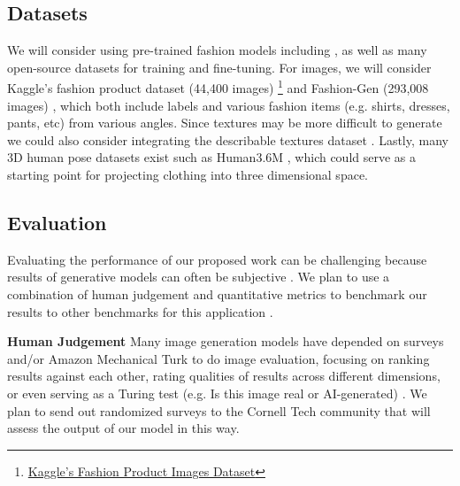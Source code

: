 \documentclass{article}
\begin{document}



\subsection{Datasets}

We will consider using pre-trained fashion models including \cite{todo}, as well as many open-source datasets for training and fine-tuning. For images, we will consider Kaggle's fashion product dataset (44,400 images) \footnote{\href{https://www.kaggle.com/datasets/paramaggarwal/fashion-product-images-dataset}{Kaggle's Fashion Product Images Dataset}} and Fashion-Gen (293,008 images) \cite{rost2018fashiongen}, which both include labels and various fashion items (e.g. shirts, dresses, pants, etc) from various angles. Since textures may be more difficult to generate we could also consider integrating the describable textures dataset \cite{cimpoi14describing}. Lastly, many 3D human pose datasets exist such as Human3.6M \cite{Ionescu2011pose}\cite{Ionescu2014pose}, which could serve as a starting point for projecting clothing into three dimensional space.


\subsection{Evaluation}
Evaluating the performance of our proposed work can be challenging because results of generative models can often be subjective \cite{borji2018eval}. We plan to use a combination of human judgement and quantitative metrics to benchmark our results to other benchmarks for this application \cite{todo}.

\textbf{Human Judgement} Many image generation models have depended on surveys and/or Amazon Mechanical Turk \cite{zhou2019hype} to do image evaluation, focusing on ranking results against each other, rating qualities of results across different dimensions, or even serving as a Turing test (e.g. Is this image real or AI-generated) \cite{salimans2016eval}. We plan to send out randomized surveys to the Cornell Tech community that will assess the output of our model in this way.
\end{document}
